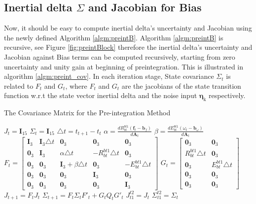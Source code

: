 \documentclass[12pt]{article}   %
\begin{document}
\subsection{Inertial delta $\Sigma$ and Jacobian for Bias}
Now, it should be easy to compute inertial delta's uncertainty and Jacobian using the newly defined Algorithm \ref{algm:preintB}. Algorithm  \ref{algm:preintB} is recursive, see Figure \ref{fig:preintBlock} therefore the inertial delta's uncertainty and Jacobian against Bias terms can be computed recursively, starting from zero uncertainty and unity gain at beginning of preintegration. This is illustrated in algorithm \ref{algm:preint_cov}. In each iteration stage, State covariance $\Sigma_t$ is related to $F_t$ and $G_t$, where $F_t$ and $G_t$ are the jacobians of the state transition function w.r.t the state vector inertial delta and the noise input $\mathrm{\bm{\eta}_k}$ respectively.

\begin{algorithm}
	\caption{The Covariance Matrix for the Pre-integration Method}
	\label{algm:preint_cov}
	\begin{algorithmic}%
		\STATE $J_t = \textbf{I}_{15}$ 
		\STATE ${\Sigma}_t = \textbf{I}_{15}$ 
		\STATE $\triangle t =  t_{t+1} - t_t$ 
		\STATE $\alpha = \frac{d R^{bt1}_{bt} (\textbf{f}_t - \textbf{b}_f)}{d \textbf{A}_t}$
		\STATE $\beta = \frac{d E^{bt1}_{bt} (\omega_t - \textbf{b}_\omega)}{d \textbf{A}_t}$
		\STATE $F_t = \begin{bmatrix} \textbf{I}_3 & \textbf{I}_3 \triangle t & \textbf{0}_3 & \textbf{0}_3 & \textbf{0}_3 \\ \textbf{0}_3 & \textbf{I}_3  & \alpha \triangle t & -R^{bt1}_{bt} \triangle t & \textbf{0}_3 \\ \textbf{0}_3 & \textbf{0}_3 & \textbf{I}_3 + \beta \triangle t & \textbf{0}_3 & -E^{bt1}_{bt} \triangle t \\ \textbf{0}_3 & \textbf{0}_3 & \textbf{0}_3 & \textbf{I}_3 & \textbf{0}_3 \\ \textbf{0}_3 & \textbf{0}_3 & \textbf{0}_3 & \textbf{0}_3 & \textbf{I}_3\end{bmatrix}$
		\STATE $G_t = \begin{bmatrix} \textbf{0}_3 & \textbf{0}_3 \\ R^{bt1}_{bt} \triangle t & \textbf{0}_3 \\ \textbf{0}_3 & E^{bt1}_{bt} \triangle t \\ \textbf{0}_3 & \textbf{0}_3 \\ \textbf{0}_3 & \textbf{0}_3 \end{bmatrix}$
		\STATE $J_{t+1} = F_{t} J_t$ 
		\STATE ${\Sigma}_{t+1} = F_{t} {\Sigma}_t F'_{t} + G_t Q_t G'_t$ 
		\ENDFOR
		\STATE $J^{t2}_{t1} = J_{t}$
		\STATE ${\Sigma}^{t2}_{t1} = {\Sigma}_{t}$
	\end{algorithmic}
\end{algorithm}
\end{document}
